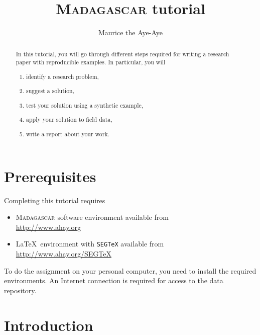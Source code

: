 \author{Maurice the Aye-Aye}
\title{\textsc{Madagascar} tutorial}


\maketitle

\begin{abstract}
  In this tutorial, you will go through different steps required for writing a research paper with reproducible examples. In particular, you will
  \begin{enumerate}
    \item identify a research problem,
    \item suggest a solution,
    \item test your solution using a synthetic example,
    \item apply your solution to field data,
    \item write  a report about your work.
  \end{enumerate}
\end{abstract}

\section{Prerequisites}

Completing this tutorial requires
\begin{itemize}
\item \textsc{Madagascar} software environment available from \\
\url{http://www.ahay.org}
\item \LaTeX\ environment with \texttt{SEGTeX} available from \\ 
\url{http://www.ahay.org/SEGTeX}
\end{itemize}
To do the assignment on your personal computer, you need to install
the required environments. An Internet connection is required for
access to the data repository.


\section{Introduction}

